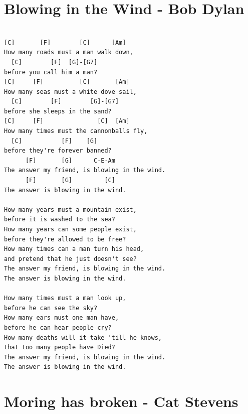 \documentclass[
]{book}
\let\stdsection\section
\renewcommand\section{\clearpage\stdsection}
\begin{document}
\hypertarget{blowing-in-the-wind---bob-dylan}{%
\section{Blowing in the Wind - Bob Dylan}\label{blowing-in-the-wind---bob-dylan}}

\begin{verbatim}

[C]       [F]        [C]      [Am] 
How many roads must a man walk down, 
  [C]        [F]  [G]-[G7]
before you call him a man?
[C]     [F]          [C]       [Am] 
How many seas must a white dove sail, 
  [C]        [F]        [G]-[G7]
before she sleeps in the sand?
[C]     [F]               [C]  [Am]
How many times must the cannonballs fly, 
  [C]           [F]    [G]
before they're forever banned?
      [F]       [G]      C-E-Am             
The answer my friend, is blowing in the wind.
      [F]       [G]         [C]
The answer is blowing in the wind.

How many years must a mountain exist, 
before it is washed to the sea?
How many years can some people exist, 
before they're allowed to be free? 
How many times can a man turn his head, 
and pretend that he just doesn't see?
The answer my friend, is blowing in the wind.
The answer is blowing in the wind.

How many times must a man look up, 
before he can see the sky?
How many ears must one man have, 
before he can hear people cry?
How many deaths will it take 'till he knows, 
that too many people have Died?
The answer my friend, is blowing in the wind.
The answer is blowing in the wind.

\end{verbatim}

\hypertarget{moring-has-broken---cat-stevens}{%
\section{Moring has broken - Cat Stevens}\label{moring-has-broken---cat-stevens}}
\end{document}
